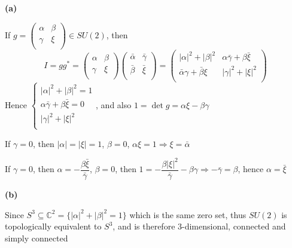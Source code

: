 \documentclass[main]{subfiles}
\begin{document}
\begin{exercise}
\begin{enumerate}[label=(\alph*),leftmargin=*]

\end{enumerate}
\end{exercise}

\textbf{(a)} \par
If $g=\left( {\begin{array}{cc}
   \alpha &\beta  \\
    \gamma & \xi \\
  \end{array} } \right)\in SU(2)$, then 
  $$
  I=gg^*=\left( {\begin{array}{cc}
   \alpha &\beta  \\
    \gamma & \xi \\
  \end{array} } \right)\left( {\begin{array}{cc}
   \bar\alpha &\bar\gamma  \\
    \bar\beta & \bar\xi \\
  \end{array} } \right)=\left( {\begin{array}{cc}
   |\alpha|^2+|\beta|^2 &\alpha\bar\gamma+\beta\bar\xi  \\
    \bar\alpha\gamma+\bar\beta\xi & |\gamma|^2+|\xi|^2 \\
  \end{array} } \right)
  $$
Hence $\begin{cases}
  |\alpha|^2+|\beta|^2=1 \\
  \alpha\bar\gamma+\beta\bar\xi=0 \\
  |\gamma|^2+|\xi|^2 \\
\end{cases}$, and also $1=\det g=\alpha\xi-\beta\gamma$ \par
If $\gamma=0$, then $|\alpha|=|\xi|=1$, $\beta=0$, $\alpha\xi=1\Rightarrow \xi=\bar\alpha$ \par
If $\gamma=0$, then $\alpha=-\dfrac{\beta\bar\xi}{\bar\gamma}$, $\beta=0$, then $1=-\dfrac{\beta|\xi|^2}{\bar\gamma}-\beta\gamma\Rightarrow-\bar\gamma=\beta$, hence $\alpha=\bar\xi$ \par
\textbf{(b)} \par
Since $S^3\subseteq \mathbb{C}^2=\{|\alpha|^2+|\beta|^2=1\}$ which is the same zero set, thus $SU(2)$ is topologically equivalent to $S^3$, and is therefore 3-dimensional, connected and simply connected \par
\end{document}
